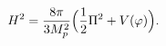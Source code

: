 \begin{equation} \label{eom2}
H^{2}=\frac{8 \pi}{3 M_{p}^{2}} \Bigl( \frac{1}{2} \Pi^{2}
+V(\varphi) \Bigr).
\end{equation}

